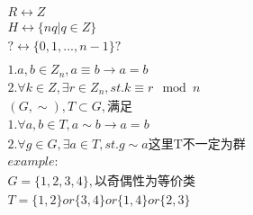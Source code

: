 \documentclass[12pt, a4paper]{article}  %
\begin{document}
\begin{align}
    &R\leftrightarrow Z\\
    & H\leftrightarrow \{nq|q\in Z\}\\
    &? \leftrightarrow \{0,1,...,n-1\}?\\
    &\\
    &1. a,b\in Z_n,a\equiv b\rightarrow a=b\\
    &2.\forall k\in Z,\exists r\in Z_n,st. k\equiv r\mod n\\
    &(G,\sim),T\subset G,\text{满足}\\
    &1.\forall a,b\in T,a\sim b\rightarrow a=b\\
    &2.\forall g\in G,\exists a\in T,st. g\sim a \text{这里T不一定为群}\\
    &example:\\
    & G=\{1,2,3,4\},\text{以奇偶性为等价类}\\
    & T=\{1,2\} or \{3,4\} or \{1,4\} or\{2,3\}
\end{align}
\end{document}
